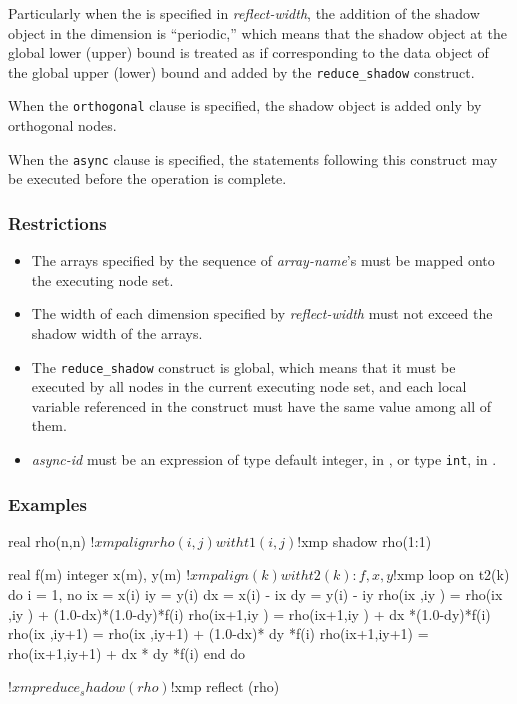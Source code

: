 Particularly when the  is specified in
{\it reflect-width}, the addition of the shadow object in the dimension is
``periodic,'' which means that the shadow object at the global lower
(upper) bound is treated as if corresponding to the data object of the
global upper (lower) bound and added by the {\tt reduce\_shadow}
construct.

When the {\tt orthogonal} clause is specified,
the shadow object is added only by orthogonal nodes.

When the {\tt async} clause is specified, the statements following this
construct may be executed before the operation is complete.

\subsubsection*{Restrictions}

\begin{itemize}
 \item The arrays specified by the sequence of {\it array-name}'s must
       be mapped onto the executing node set.
 \item The width of each dimension specified by {\it
       reflect-width} must not exceed the shadow width of the arrays.
 \item The {\tt reduce\_shadow} construct is global, which means that it must be
       executed by all nodes in the current executing node set, and each local
       variable referenced in the construct must have the same value
       among all of them.
 \item {\it async-id} must be an expression of type default integer, in
       {\XMPF}, or type {\tt int}, in {\XMPC}.
\end{itemize}

\subsubsection*{Examples}

\begin{XFexample}
      real rho(n,n)
!$xmp align rho(i,j) with t1(i,j)
!$xmp shadow rho(1:1)

      real f(m)
      integer x(m), y(m)
!$xmp align (k) with t2(k) : f, x, y

!$xmp loop on t2(k)
      do i = 1, no
        ix = x(i)
        iy = y(i)
        dx = x(i) - ix
        dy = y(i) - iy
        rho(ix  ,iy  ) = rho(ix  ,iy  ) + (1.0-dx)*(1.0-dy)*f(i)
        rho(ix+1,iy  ) = rho(ix+1,iy  ) +      dx *(1.0-dy)*f(i)
        rho(ix  ,iy+1) = rho(ix  ,iy+1) + (1.0-dx)*     dy *f(i)
        rho(ix+1,iy+1) = rho(ix+1,iy+1) +      dx *     dy *f(i)
      end do

!$xmp reduce_shadow (rho)
!$xmp reflect (rho)
\end{XFexample}

